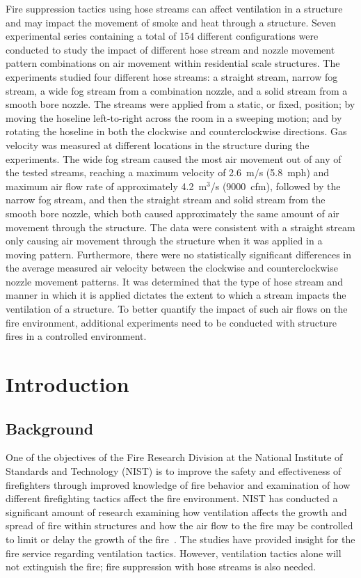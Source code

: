 \documentclass[12pt,oneside]{book}
\begin{document}
Fire suppression tactics using hose streams can affect ventilation in a structure and may impact the movement of smoke and heat through a structure. Seven experimental series containing a total of 154 different configurations were conducted to study the impact of different hose stream and nozzle movement pattern combinations on air movement within residential scale structures. The experiments studied four different hose streams: a straight stream, narrow fog stream, a wide fog stream from a combination nozzle, and a solid stream from a smooth bore nozzle. The streams were applied from a static, or fixed, position; by moving the hoseline left-to-right across the room in a sweeping motion; and by rotating the hoseline in both the clockwise and counterclockwise directions. Gas velocity was measured at different locations in the structure during the experiments. The wide fog stream caused the most air movement out of any of the tested streams, reaching a maximum velocity of 2.6~m/s (5.8~mph) and maximum air flow rate of approximately 4.2~m$^3$/s (9000~cfm), followed by the narrow fog stream, and then the straight stream and solid stream from the smooth bore nozzle, which both caused approximately the same amount of air movement through the structure. The data were consistent with a straight stream only causing air movement through the structure when it was applied in a moving pattern. Furthermore, there were no statistically significant differences in the average measured air velocity between the clockwise and counterclockwise nozzle movement patterns. It was determined that the type of hose stream and manner in which it is applied dictates the extent to which a stream impacts the ventilation of a structure. To better quantify the impact of such air flows on the fire environment, additional experiments need to be conducted with structure fires in a controlled environment.

\mainmatter

\chapter{Introduction}
\label{chap:intro}
\section{Background}
\label{sec:background}

One of the objectives of the Fire Research Division at the National Institute of Standards and Technology (NIST) is to improve the safety and effectiveness of firefighters through improved knowledge of fire behavior and examination of how different firefighting tactics affect the fire environment. NIST has conducted a significant amount of research examining how ventilation affects the growth and spread of fire within structures and how the air flow to the fire may be controlled to limit or delay the growth of the fire~\cite{madrzykowski2009fire,kerber2009fire}. The studies have provided insight for the fire service regarding ventilation tactics. However, ventilation tactics alone will not extinguish the fire; fire suppression with hose streams is also needed.
\end{document}
